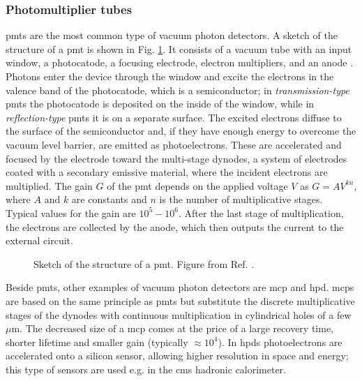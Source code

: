 \subsubsection*{Photomultiplier tubes}  

\glspl{pmt} are the most common type of vacuum photon detectors. 
A sketch of the structure of a \gls{pmt} is shown in Fig. \ref{fig:det:pmt}. It consists of a vacuum tube with an input window, a photocatode, 
a focusing electrode, electron multipliers, and an anode  \cite{hamamatsu}. 
Photons enter the device through the window and excite the electrons in the valence band of the photocatode, which is a semiconductor; 
in \textit{transmission-type} \glspl{pmt} the photocatode is deposited on the inside of the window, 
while in \textit{reflection-type} \glspl{pmt} it is on a separate surface. 
The excited electrons diffuse to the surface of the semiconductor and, if they have enough energy to overcome the vacuum level barrier, 
are emitted as photoelectrons. These are accelerated and focused by the electrode toward the multi-stage dynodes, 
a system of electrodes coated with a secondary emissive material, 
where the incident electrons are multiplied. 
The gain $G$ of the \gls{pmt} depends on the applied voltage $V$ as $G=AV^{kn}$, 
where $A$ and $k$ are constants and $n$ is the number of multiplicative stages. 
Typical values for the gain are $10^5-10^6$. After the last stage of multiplication, the electrons are collected by the anode, 
which then outputs the current to the external circuit.

\begin{figure}[ht]
\centering
{}
\caption{Sketch of the structure of a \gls{pmt}. Figure from Ref. \cite{hamamatsu}.}
\label{fig:det:pmt}
\end{figure}

Beside \glspl{pmt}, other examples of vacuum photon detectors are \gls{mcp} and \gls{hpd}. \glspl{mcp} are based on the same principle as \glspl{pmt} but substitute the discrete multiplicative stages of the dynodes with continuous multiplication in cylindrical holes of a few $\mu$m. The decreased size of a \gls{mcp} comes at the price of a large recovery time, shorter lifetime and smaller gain (typically $\approx 10^4$). In \glspl{hpd} photoelectrons are accelerated onto a silicon sensor, allowing higher resolution in space and energy; this type of sensors are used e.g. in the \gls{cms} hadronic calorimeter.

